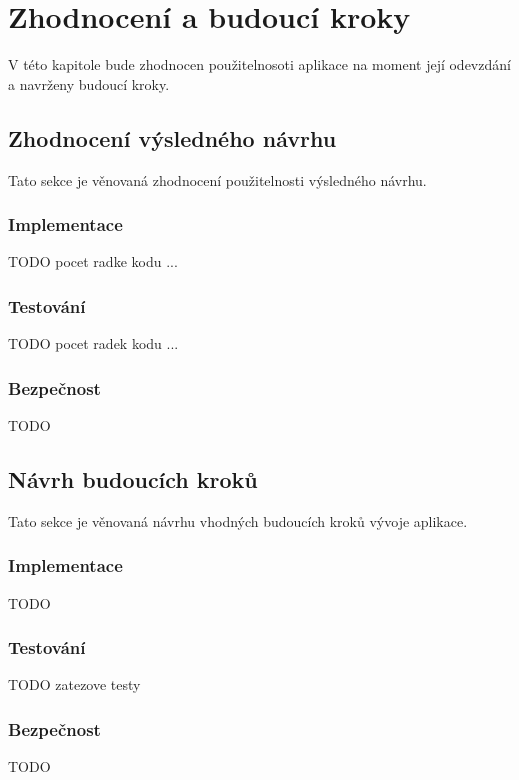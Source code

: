 \chapter{Zhodnocení a budoucí kroky}\label{zhodnocení}
V této kapitole bude zhodnocen použitelnosoti aplikace na moment její odevzdání a navrženy budoucí kroky.
\section{Zhodnocení výsledného návrhu}
    Tato sekce je věnovaná zhodnocení použitelnosti výsledného návrhu. 
    \subsection{Implementace}
        TODO pocet radke kodu ...
    \subsection{Testování}
        TODO pocet radek kodu ...
    \subsection{Bezpečnost}
        TODO

\section{Návrh budoucích kroků}
    Tato sekce je věnovaná návrhu vhodných budoucích kroků vývoje aplikace.
    \subsection{Implementace}
        TODO
    \subsection{Testování}
        TODO zatezove testy
    \subsection{Bezpečnost}
        TODO
